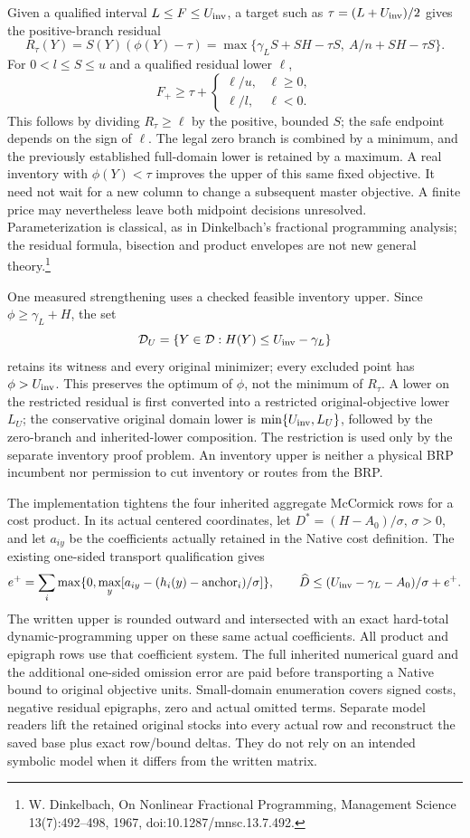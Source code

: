 Given a qualified interval $L\le F\le U_{\rm inv}$, a target such as
$\tau=(L+U_{\rm inv})/2$ gives the positive-branch residual
\[
 R_\tau(Y)=S(Y)(\phi(Y)-\tau)
 =\max\{\gamma_L S+SH-\tau S,\ A/n+SH-\tau S\}.
\]
For $0<l\le S\le u$ and a qualified residual lower $\ell$,
\[
 F_+\ge\tau+
 \begin{cases}\ell/u,&\ell\ge0,\\\ell/l,&\ell<0.\end{cases}
\]
This follows by dividing $R_\tau\ge\ell$ by the positive, bounded $S$;
the safe endpoint depends on the sign of $\ell$. The legal zero branch
is combined by a minimum, and the previously established full-domain
lower is retained by a maximum. A real inventory with $\phi(Y)<\tau$
improves the upper of this same fixed objective. It need not wait for a
new column to change a subsequent master objective. A finite price may
nevertheless leave both midpoint decisions unresolved. Parameterization
is classical, as in Dinkelbach's fractional programming analysis; the
residual formula, bisection and product envelopes are not new general
theory.\footnote{W. Dinkelbach, On Nonlinear Fractional Programming,
Management Science 13(7):492--498, 1967, doi:10.1287/mnsc.13.7.492.}

One measured strengthening uses a checked feasible inventory upper. Since
$\phi\ge\gamma_L+H$, the set
\[
 \mathcal D_U=\{Y\in\mathcal D:H(Y)\le U_{\rm inv}-\gamma_L\}
\]
retains its witness and every original minimizer; every excluded point has
$\phi>U_{\rm inv}$. This preserves the optimum of $\phi$, not the minimum
of $R_\tau$. A lower on the restricted residual is first converted into
a restricted original-objective lower $L_U$; the conservative original
domain lower is $\min\{U_{\rm inv},L_U\}$, followed by the zero-branch and
inherited-lower composition. The restriction is used only by the separate
inventory proof problem. An inventory upper is neither a physical BRP
incumbent nor permission to cut inventory or routes from the BRP.

The implementation tightens the four inherited aggregate McCormick rows
for a cost product. In its actual centered coordinates, let
$D^*=(H-A_0)/\sigma$, $\sigma>0$, and let $a_{iy}$ be the coefficients
actually retained in the Native cost definition. The existing one-sided
transport qualification gives
\[
 e^+=\sum_i\max\{0,\max_y[a_{iy}-(h_i(y)-\mathrm{anchor}_i)/\sigma]\},
 \qquad
 \widehat D\le (U_{\rm inv}-\gamma_L-A_0)/\sigma+e^+.
\]
The written upper is rounded outward and intersected with an exact
hard-total dynamic-programming upper on these same actual coefficients.
All product and epigraph rows use that coefficient system. The full
inherited numerical guard and the additional one-sided omission error
are paid before transporting a Native bound to original objective units.
Small-domain enumeration covers signed costs, negative residual epigraphs,
zero and actual omitted terms. Separate model readers lift the retained
original stocks into every actual row and reconstruct the saved base plus
exact row/bound deltas. They do not rely on an intended symbolic model
when it differs from the written matrix.

